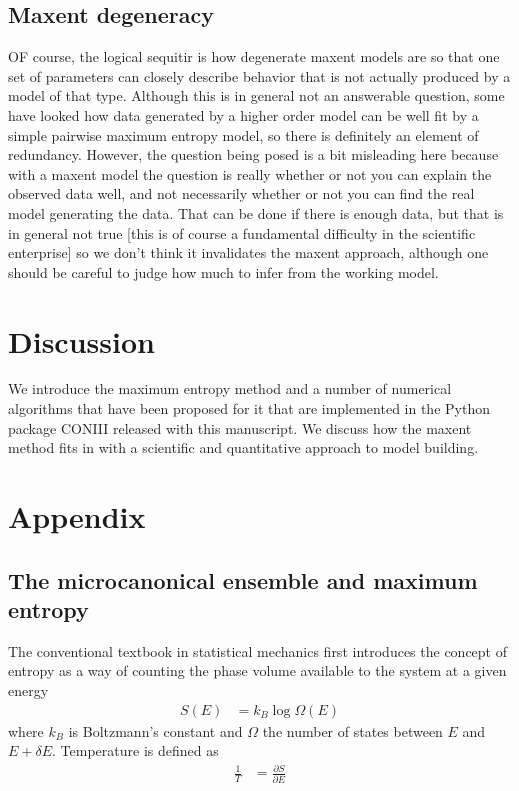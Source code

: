 \documentclass[aps,prl,twocolumn]{revtex4-1}
\begin{document}
\subsection{Maxent degeneracy}
OF course, the logical sequitir is how degenerate maxent models are so that one set of parameters can closely describe behavior that is not actually produced by a model of that type. Although this is in general not an answerable question, some have looked how data generated by a higher order model can be well fit by a simple pairwise maximum entropy model, so there is definitely an element of redundancy. However, the question being posed is a bit misleading here because with a maxent model the question is really whether or not you can explain the observed data well, and not necessarily whether or not you can find the real model generating the data. That can be done if there is enough data, but that is in general not true [this is of course a fundamental difficulty in the scientific enterprise] so we don't think it invalidates the maxent approach, although one should be careful to judge how much to infer from the working model.


\section{Discussion}
We introduce the maximum entropy method and a number of numerical algorithms that have been proposed for it that are implemented in the Python package CONIII released with this manuscript. We discuss how the maxent method fits in with a scientific and quantitative approach to model building.

\appendix
\section{Appendix}
\subsection{The microcanonical ensemble and maximum entropy}
The conventional textbook in statistical mechanics first introduces the concept of entropy as a way of counting the phase volume available to the system at a given energy
\begin{align}
	S(E) &= k_B \log\Omega(E)
\end{align}
where $k_B$ is Boltzmann's constant and $\Omega$ the number of states between $E$ and $E+\delta E$. Temperature is defined as
\begin{align}
	\frac{1}{T} &= \frac{\partial S}{\partial E}
\end{align}
\end{document}
